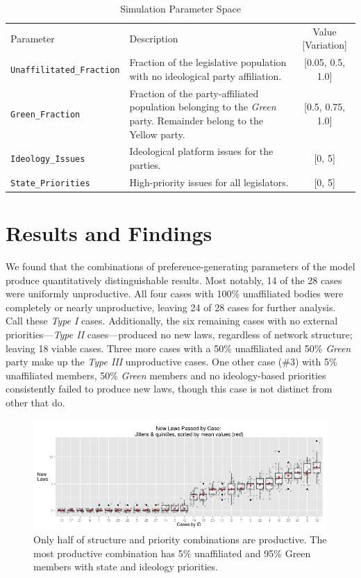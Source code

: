 \documentclass[pdftex,12pt]{llncs}
\begin{document}
\begin{table}
 \caption{Simulation Parameter Space}
 \begin{tabular}{lp{2.25in}c}
 \hline\noalign{\smallskip}
 Parameter & Description & Value [Variation] \\
 \noalign{\smallskip}
 \hline
 \noalign{\smallskip}
 \texttt{Unaffilitated\_Fraction} & Fraction of the legislative population with no ideological party  affiliation. & [0.05, 0.5, 1.0] \\
 \texttt{Green\_Fraction} & Fraction of the party-affiliated population belonging to the \textit{Green} party. Remainder belong to the Yellow party. & [0.5, 0.75, 1.0] \\
 \texttt{Ideology\_Issues} & Ideological platform issues for the parties. & [0, 5] \\
 \texttt{State\_Priorities} & High-priority issues for all legislators. & [0, 5] \\
 \hline
 \end{tabular}
 \label{params}
\end{table}


\section{Results and Findings}
%
We found that the combinations of preference-generating parameters of the model produce quantitatively distinguishable results.
Most notably, 14 of the 28 cases were uniformly unproductive.
All four cases with 100\% unaffiliated bodies were completely or nearly unproductive, leaving 24 of 28 cases for further analysis.
Call these \textit{Type I} cases.
Additionally, the six remaining cases with no external priorities---\textit{Type II} cases---produced no new laws, regardless of network structure; leaving 18 viable cases.
Three more cases with a 50\% unaffiliated and 50\% \textit{Green} party make up the \textit{Type III} unproductive cases.
One other case (\#3) with 5\% unaffiliated members, 50\% \textit{Green} members and no ideology-based priorities consistently failed to produce new laws, though this case is not distinct from other that do. 

\begin{figure}[h]
\centering
\includegraphics[width=4.9in]{laws_byJob_jitterQuints.png}
\caption[ ]{Only half of structure and priority combinations are productive. The most productive combination has 5\% unaffiliated and 95\% Green members with state and ideology priorities.} 
\label{lawspassed}
\end{figure}
  
\end{document}
